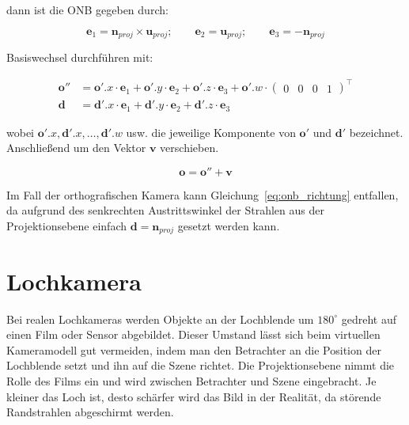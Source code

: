 dann ist die ONB gegeben durch:

\begin{equation}
    \boldsymbol{e}_1 = \boldsymbol{n}_{proj} \times \boldsymbol{u}_{proj}; \qquad \boldsymbol{e}_2 = \boldsymbol{u}_{proj}; \qquad \boldsymbol{e}_3 = -\boldsymbol{n}_{proj}
    \label{eq:onb}
\end{equation}

Basiswechsel durchführen mit:

\begin{align}
    \boldsymbol{o''} &= \boldsymbol{o'}.x \cdot \boldsymbol{e}_1 + \boldsymbol{o'}.{y} \cdot \boldsymbol{e}_2 + \boldsymbol{o'}.{z} \cdot \boldsymbol{e}_3 + 
                      \boldsymbol{o'}.{w} \cdot \begin{pmatrix} 0 & 0 & 0 & 1 \end{pmatrix}^\intercal \\
    \boldsymbol{d}         &= \boldsymbol{d'}.{x} \cdot \boldsymbol{e}_1 + \boldsymbol{d'}.{y} \cdot \boldsymbol{e}_2 + \boldsymbol{d'}.{z} \cdot \boldsymbol{e}_3 \label{eq:onb_richtung}
\end{align}

wobei \( \boldsymbol{o'}.{x}, \boldsymbol{d'}.{x}, \dots, \boldsymbol{d'}.w\) usw. die jeweilige Komponente von \( \boldsymbol{o'} \) und \( \boldsymbol{d}' \) bezeichnet.
Anschließend um den Vektor \( \boldsymbol{v} \) verschieben.

\begin{equation*}
    \boldsymbol{o} = \boldsymbol{o''} + \boldsymbol{v}
\end{equation*}

Im Fall der orthografischen Kamera kann Gleichung~\ref{eq:onb_richtung} entfallen, da aufgrund des senkrechten Austrittswinkel der Strahlen aus der Projektionsebene einfach \( \boldsymbol{d} = \boldsymbol{n}_{proj} \) gesetzt werden kann.


\section{Lochkamera}

Bei realen Lochkameras werden Objekte an der Lochblende um \( 180^\circ \) gedreht auf einen Film oder Sensor abgebildet. Dieser Umstand lässt sich beim virtuellen Kameramodell gut vermeiden, indem man den Betrachter an die Position der Lochblende setzt und ihn auf die Szene richtet. Die Projektionsebene nimmt die Rolle des Films ein und wird zwischen Betrachter und Szene eingebracht. Je kleiner das Loch ist, desto schärfer wird das Bild in der Realität, da störende Randstrahlen abgeschirmt werden.

